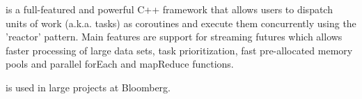 \cite{bbquantum} is a full-featured and
powerful C++ framework that allows users to dispatch units of work (a.k.a.
tasks) as coroutines and execute them concurrently using the 'reactor' pattern.
Main features are support for streaming futures which allows faster processing
of large data sets, task prioritization, fast pre-allocated memory pools and
parallel forEach and mapReduce functions.

\bbquantum\xspace is used in large projects at Bloomberg.

